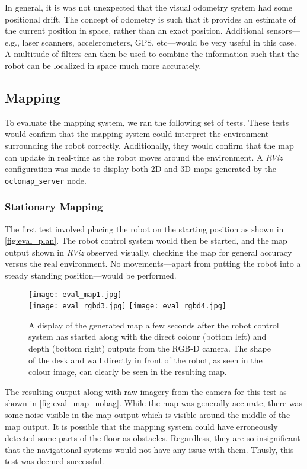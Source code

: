 In general, it is was not unexpected that the visual odometry system had some positional drift. The concept of odometry is such that it provides an estimate of the current position in space, rather than an exact position. Additional sensors---e.g., laser scanners, accelerometers, GPS, etc---would be very useful in this case. A multitude of filters can then be used to combine the information such that the robot can be localized in space much more accurately.

\subsection{Mapping}

To evaluate the mapping system, we ran the following set of tests. These tests would confirm that the mapping system could interpret the environment surrounding the robot correctly. Additionally, they would confirm that the map can update in real-time as the robot moves around the environment. A \emph{RViz} configuration was made to display both 2D and 3D maps generated by the \texttt{octomap\_server} node.

\subsubsection{Stationary Mapping}

The first test involved placing the robot on the starting position as shown in \autoref{fig:eval_plan}. The robot control system would then be started, and the map output shown in \emph{RViz} observed visually, checking the map for general accuracy versus the real environment. No movements---apart from putting the robot into a steady standing position---would be performed.

\begin{figure}[h]
	\centering
	\texttt{[image: eval\_map1.jpg]} \\
	\vspace{2pt}
	\texttt{[image: eval\_rgbd3.jpg]}
	\texttt{[image: eval\_rgbd4.jpg]}
	\caption{A display of the generated map a few seconds after the robot control system has started along with the direct colour (bottom left) and depth (bottom right) outputs from the RGB-D camera. The shape of the desk and wall directly in front of the robot, as seen in the colour image, can clearly be seen in the resulting map.}
	\label{fig:eval_map_nobag}
\end{figure}

The resulting output along with raw imagery from the camera for this test as shown in \autoref{fig:eval_map_nobag}. While the map was generally accurate, there was some noise visible in the map output which is visible around the middle of the map output. It is possible that the mapping system could have erroneously detected some parts of the floor as obstacles. Regardless, they are so insignificant that the navigational systems would not have any issue with them. Thusly, this test was deemed successful.

